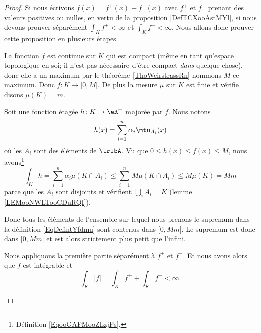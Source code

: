 \begin{proof}
	Si nous écrivons \( f(x)=f^+(x)-f^-(x)\) avec \( f^+\) et \( f^-\) prenant des valeurs positives ou nulles\cite{ooFSBCooVpuWaV}, en vertu de la proposition \ref{DefTCXooAstMYl}, si nous devons prouver séparément \( \int_Kf^+<\infty\) et \( \int_Kf^-<\infty\). Nous allons donc prouver cette proposition en plusieurs étapes.
	\begin{subproof}
		La fonction \( f\) est continue sur \( K\) qui est compact (même en tant qu'espace topologique en soi; il n'est pas nécessaire d'être compact \emph{dans} quelque chose), donc elle a un maximum par le théorème \ref{ThoWeirstrassRn} nommons \( M\) ce maximum. Donc \( f\colon K\to \mathopen[ 0 , M \mathclose]\). De plus la mesure \( \mu\) sur \( K\) est finie et vérifie disons \( \mu(K)=m\).

		Soit une fonction étagée \( h\colon K\to \eR^+\) majorée par \( f\). Nous notons
		\begin{equation}
			h(x)=\sum_{i=1}^n\alpha_i\mtu_{A_i}(x)
		\end{equation}
		où les \( A_i\) sont des éléments de \( \tribA\). Vu que \( 0\leq h(x)\leq f(x)\leq M\), nous avons\footnote{Définition \eqref{EqooGAFMooZLzjPs}.}
		\begin{equation}
			\int_Kh=\sum_{i=1}^n\alpha_i\mu(K\cap A_i)\leq \sum_{i=1}^nM\mu(K\cap A_i)\leq M\mu(K)=Mm
		\end{equation}
		parce que les \( A_i\) sont disjoints et vérifient \( \bigcup_iA_i=K\) (lemme \ref{LEMooNWLTooCDuRQI}).

		Donc tous les éléments de l'ensemble sur lequel nous prenons le supremum dans la définition \eqref{EqDefintYfdmu} sont contenus dans \( \mathopen[ 0 , Mm \mathclose]\). Le supremum est donc dans \( \mathopen[ 0 , Mm \mathclose]\) et est alors strictement plus petit que l'infini.

		Nous appliquons la première partie séparément à \( f^+\) et \( f^-\). Et nous avons alors que \( f\) est intégrable et
		\begin{equation}
			\int_K| f |=\int_Kf^++\int_Kf^-<\infty.
		\end{equation}
	\end{subproof}
\end{proof}

